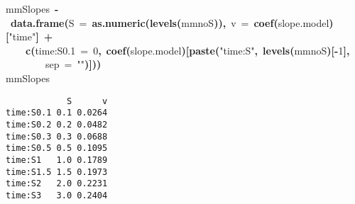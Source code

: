 \documentclass{article}\usepackage{graphicx, color}
\makeatletter
\newcommand{\hlnumber}[1]{\textcolor[rgb]{0,0,0}{#1}}%
\newcommand{\hlfunctioncall}[1]{\textcolor[rgb]{0.501960784313725,0,0.329411764705882}{\textbf{#1}}}%
\newcommand{\hlstring}[1]{\textcolor[rgb]{0.6,0.6,1}{#1}}%
\newcommand{\hlkeyword}[1]{\textcolor[rgb]{0,0,0}{\textbf{#1}}}%
\newcommand{\hlargument}[1]{\textcolor[rgb]{0.690196078431373,0.250980392156863,0.0196078431372549}{#1}}%
\newcommand{\hlassignement}[1]{\textcolor[rgb]{0,0,0}{\textbf{#1}}}%
\newcommand{\hlsymbol}[1]{\textcolor[rgb]{0,0,0}{#1}}%
\newcommand{\hlstd}[1]{\textcolor[rgb]{0,0,0}{#1}}%
\newenvironment{kframe}{%
 \def\FrameCommand##1{\hskip\@totalleftmargin \hskip-\fboxsep
 \colorbox{shadecolor}{##1}\hskip-\fboxsep
     \hskip-\linewidth \hskip-\@totalleftmargin \hskip\columnwidth}%
 \MakeFramed {\advance\hsize-\width
   \@totalleftmargin\z@ \linewidth\hsize
   \@setminipage}}%
 {\par\unskip\endMakeFramed}
\newenvironment{knitrout}{}{} %
\makeatother
\begin{document}
\begin{knitrout}
\color{fgcolor}\begin{kframe}
\begin{flushleft}
\ttfamily\noindent
\hlsymbol{mmSlopes}{\ }\hlassignement{\usebox{\hlnormalsizeboxlessthan}-}{\ }\hlfunctioncall{data.frame}\hlkeyword{(}\hlargument{S}{\ }\hlargument{=}{\ }\hlfunctioncall{as.numeric}\hlkeyword{(}\hlfunctioncall{levels}\hlkeyword{(}\hlsymbol{mmno}\hlkeyword{\usebox{\hlnormalsizeboxdollar}}\hlsymbol{S}\hlkeyword{)}\hlkeyword{)}\hlkeyword{,}{\ }\hlargument{v}{\ }\hlargument{=}{\ }\hlfunctioncall{coef}\hlkeyword{(}\hlsymbol{slope.model}\hlkeyword{)}\hlkeyword{[}\hlstring{"{}{}time"{}{}}\hlkeyword{]}{\ }\hlkeyword{+}\hspace*{\fill}\\
\hlstd{}{\ }{\ }{\ }{\ }\hlfunctioncall{c}\hlkeyword{(}\hlargument{\usebox{\hlnormalsizeboxbacktick}time:S0.1\usebox{\hlnormalsizeboxbacktick}}{\ }\hlargument{=}{\ }\hlnumber{0}\hlkeyword{,}{\ }\hlfunctioncall{coef}\hlkeyword{(}\hlsymbol{slope.model}\hlkeyword{)}\hlkeyword{[}\hlfunctioncall{paste}\hlkeyword{(}\hlstring{"{}{}time:S"{}{}}\hlkeyword{,}{\ }\hlfunctioncall{levels}\hlkeyword{(}\hlsymbol{mmno}\hlkeyword{\usebox{\hlnormalsizeboxdollar}}\hlsymbol{S}\hlkeyword{)}\hlkeyword{[}\hlkeyword{-}\hlnumber{1}\hlkeyword{]}\hlkeyword{,}\hspace*{\fill}\\
\hlstd{}{\ }{\ }{\ }{\ }{\ }{\ }{\ }{\ }\hlargument{sep}{\ }\hlargument{=}{\ }\hlstring{"{}{}"{}{}}\hlkeyword{)}\hlkeyword{]}\hlkeyword{)}\hlkeyword{)}\hspace*{\fill}\\
\hlstd{}\hlsymbol{mmSlopes}\mbox{}
\normalfont
\end{flushleft}
\begin{verbatim}
            S      v
time:S0.1 0.1 0.0264
time:S0.2 0.2 0.0482
time:S0.3 0.3 0.0688
time:S0.5 0.5 0.1095
time:S1   1.0 0.1789
time:S1.5 1.5 0.1973
time:S2   2.0 0.2231
time:S3   3.0 0.2404
\end{verbatim}
\end{kframe}
\end{knitrout}
\end{document}
